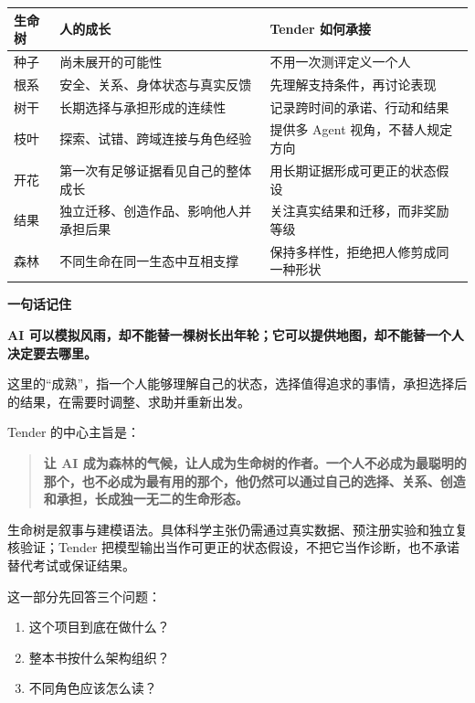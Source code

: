 \documentclass[UTF8,a4paper,11pt]{ctexart}
\newenvironment{explainbox}[1]
{\begin{center}\begin{minipage}{0.94\textwidth}\colorbox{boxbg}{\parbox{0.92\textwidth}{\textbf{#1}\par\vspace{2pt}}}}
{\end{minipage}\end{center}}
\begin{document}
\begin{center}
\begin{longtable}{@{}p{2.2cm}p{5.5cm}p{6.3cm}@{}}
\toprule
\textbf{生命树} & \textbf{人的成长} & \textbf{Tender 如何承接} \\
\midrule
种子 & 尚未展开的可能性 & 不用一次测评定义一个人 \\
根系 & 安全、关系、身体状态与真实反馈 & 先理解支持条件，再讨论表现 \\
树干 & 长期选择与承担形成的连续性 & 记录跨时间的承诺、行动和结果 \\
枝叶 & 探索、试错、跨域连接与角色经验 & 提供多 Agent 视角，不替人规定方向 \\
开花 & 第一次有足够证据看见自己的整体成长 & 用长期证据形成可更正的状态假设 \\
结果 & 独立迁移、创造作品、影响他人并承担后果 & 关注真实结果和迁移，而非奖励等级 \\
森林 & 不同生命在同一生态中互相支撑 & 保持多样性，拒绝把人修剪成同一种形状 \\
\bottomrule
\end{longtable}
\end{center}

\begin{explainbox}{一句话记住}
\textbf{AI 可以模拟风雨，却不能替一棵树长出年轮；它可以提供地图，却不能替一个人决定要去哪里。}
\end{explainbox}

这里的“成熟”，指一个人能够理解自己的状态，选择值得追求的事情，承担选择后的结果，在需要时调整、求助并重新出发。

Tender 的中心主旨是：

\begin{quote}
\textbf{让 AI 成为森林的气候，让人成为生命树的作者。一个人不必成为最聪明的那个，也不必成为最有用的那个，他仍然可以通过自己的选择、关系、创造和承担，长成独一无二的生命形态。}
\end{quote}

生命树是叙事与建模语法。具体科学主张仍需通过真实数据、预注册实验和独立复核验证；Tender 把模型输出当作可更正的状态假设，不把它当作诊断，也不承诺替代考试或保证结果。


这一部分先回答三个问题：
\begin{enumerate}[leftmargin=2em]
\item 这个项目到底在做什么？
\item 整本书按什么架构组织？
\item 不同角色应该怎么读？
\end{enumerate}
\end{document}
